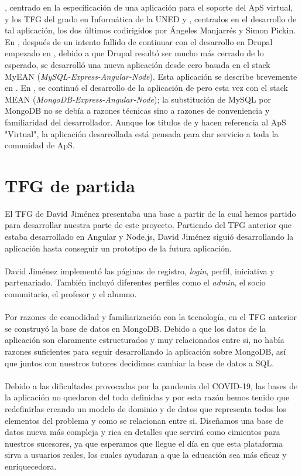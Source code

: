 \documentclass[11pt]{book}
\begin{document}
\cite{ref3}, centrado en la especificación de una aplicación para el soporte del
ApS virtual, y los TFG del grado en Informática de la UNED \cite{ref4} y \cite{ref5},
centrados en el desarrollo de tal aplicación, los dos últimos
codirigidos por Ángeles Manjarrés y Simon Pickin. En \cite{ref4}, después de un
intento fallido de continuar con el desarrollo en Drupal empezado en
\cite{ref3}, debido a que Drupal resultó ser mucho más cerrado de lo esperado,
se desarrolló una nueva aplicación desde cero basada en el stack MyEAN
(\emph{MySQL-Express-Angular-Node}). Esta aplicación se describe brevemente en
\cite{ref6}. En \cite{ref5}, se continuó el desarrollo de la aplicación de \cite{ref4} pero esta
vez con el stack MEAN (\emph{MongoDB-Express-Angular-Node}); la substitución de
MySQL por MongoDB no se debía a razones técnicas sino a razones de
conveniencia y familiaridad del desarrollador. Aunque los títulos de \cite{ref4}
y \cite{ref5} hacen referencia al ApS "Virtual", la aplicación desarrollada está
pensada para dar servicio a toda la comunidad de ApS.

\section{TFG de partida}
El TFG de David Jiménez presentaba una base a partir de la cual hemos partido para desarrollar nuestra parte de este proyecto. Partiendo del TFG anterior que estaba desarrollado en Angular y Node.js, David Jiménez siguió desarrollando la aplicación hasta conseguir un prototipo de la futura aplicación.\\\\
David Jiménez implementó las páginas de registro, \textit{login}, perfil, iniciativa y partenariado. También incluyó diferentes perfiles como el \textit{admin}, el socio comunitario, el profesor y el alumno.\\\\
 Por razones de comodidad y familiarización con la tecnología, en el TFG anterior se construyó la base de datos en MongoDB. Debido a que los datos de la aplicación son claramente estructurados y muy relacionados entre si, no había razones suficientes para seguir desarrollando la aplicación sobre MongoDB, así que juntos con nuestros tutores decidimos cambiar la base de datos a SQL.\\\\
Debido a las dificultades provocadas por la pandemia del COVID-19, las bases de la aplicación no quedaron del todo definidas y por esta razón hemos tenido que redefinirlas creando un modelo de dominio y de datos que representa todos los elementos del problema y como se relacionan entre si. Diseñamos una base de datos nueva más compleja y rica en detalles que servirá como cimientos para nuestros sucesores, ya que esperamos que llegue el día en que esta plataforma sirva a usuarios reales, los cuales ayudaran a que la educación sea más eficaz y enriquecedora.
 
\end{document}

